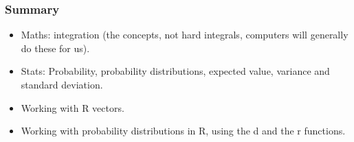 \documentclass{beamer}
\begin{document}
\begin{frame}[fragile]
\frametitle{Summary}
\begin{itemize}
\item Maths: integration (the concepts, not hard integrals, computers
will generally do these for us).\pause
\item Stats: Probability, probability distributions, expected value,
variance and standard deviation.\pause
\item Working with R vectors.\pause
\item Working with probability distributions in R, using the d and the r
functions.
\end{itemize}
\end{frame}
\end{document}
